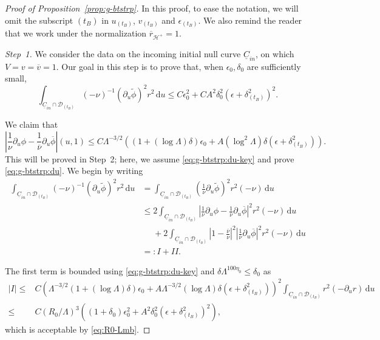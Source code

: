 \documentclass[10pt, reqno]{amsart}
\theoremstyle{definition}
\theoremstyle{remark}
\theoremstyle{conjecture}
\numberwithin{equation}{section}
\newcommand{\abs}[1]{\vert#1\vert}
\newcommand{\ud}{\mathrm{d}}
\newcommand{\rd}{\partial}
\newcommand{\0}{\emptyset}
\newcommand{\dlt}{\delta}
\newcommand{\eps}{\epsilon}
\newcommand{\Lmb}{\Lambda}
\newcommand{\calD}{\mathcal D}
\newcommand{\calH}{\mathcal H}
\newcommand{\uC}{\underline{C}}
\newcommand{\dur}{\nu}
\newcommand{\de}{\delta}
\newcommand{\EH}{\calH^{+}}
\newcommand{\pfstep}[1]{\vspace{.5em} {\it \noindent #1.}}
\newcommand{\vbg}{\overline{v}}					%
\newcommand{\phibg}{\overline{\phi}}				%
\newcommand{\durbg}{\overline{\dur}}				%
\newcommand{\rbg}{\overline{r}}					%
\newcommand{\phidf}{\widetilde{\phi}}				%
\newcommand{\Abs}[1]{\left\vert #1 \right\vert}
\begin{document}
\begin{proof}[Proof of Proposition~\ref{prop:g-btstrp}]
In this proof, to ease the notation, we will omit the subscript $(t_{B})$ in $u_{(t_{B})}$, $v_{(t_{B})}$ and $\eps_{(t_{B})}$. We also remind the reader that we work under the normalization $\rbg_{\EH} = 1$.


\pfstep{Step~1} We consider the data on the incoming initial null curve $\uC_{in}$, on which $V = v = \vbg = 1$. Our goal in this step is to prove that, when $\eps_{0}, \dlt_{0}$ are sufficiently small, 
\begin{equation} \label{eq:g-btstrp:du}
	\int_{\uC_{in} \cap \calD_{(t_{B})}} (-\dur)^{-1} (\rd_{u} \phidf)^{2} r^{2} \, \ud u
	\leq C \eps_{0}^{2} + C A^{2} \dlt_{0}^{2} \left( \eps + \dlt_{(t_{B})}^{2} \right)^{2}.
\end{equation}

We claim that 
\begin{equation} \label{eq:g-btstrp:du-key}
	\Abs{\frac{1}{\dur} \rd_{u} \phi - \frac{1}{\durbg} \rd_{u} \phibg}(u, 1) \leq C \Lmb^{-3/2} \left( (1 + (\log \Lmb) \dlt) \eps_{0} + A (\log^{2} \Lmb) \dlt \left( \eps + \dlt_{(t_{B})}^{2} \right) \right).
\end{equation}
This will be proved in Step~2; here, we assume \eqref{eq:g-btstrp:du-key} and prove \eqref{eq:g-btstrp:du}. We begin by writing
\begin{align*}
	\int_{\uC_{in} \cap \calD_{(t_{B})}} (- \dur)^{-1} (\rd_{u} \phidf)^{2} r^{2} \, \ud u
	& =  \int_{\uC_{in} \cap \calD_{(t_{B})}} \left( \frac{1}{\dur} \rd_{u} \phidf \right)^{2} r^{2} (- \dur) \, \ud u \\
	& \leq  2\int_{\uC_{in} \cap \calD_{(t_{B})}} \Abs{\frac{1}{\dur} \rd_{u} \phi - \frac{1}{\durbg} \rd_{u} \phibg}^{2} r^{2}(- \dur) \, \ud u \\ 
	& \phantom{\leq}
		 + 2\int_{\uC_{in} \cap \calD_{(t_{B})}} \Abs{ 1 - \frac{\durbg}{\dur}}^{2} \Abs{\frac{1}{\durbg} \rd_{u} \phibg}^{2} r^{2}(- \dur) \, \ud u \\
	& = :  I + II.
\end{align*}

The first term is bounded using \eqref{eq:g-btstrp:du-key} and $\de \Lambda^{100\eta_0}\leq \de_0$ as 
\begin{align*}
	\abs{I} 
	\leq & C \left( \Lmb^{-3/2} (1 + (\log \Lmb) \dlt) \eps_{0} + A \Lmb^{-3/2} (\log \Lmb) \dlt \left( \eps + \dlt_{(t_{B})}^{2} \right) \right)^{2} \int_{\uC_{in} \cap \calD_{(t_{B})}} r^{2} (- \rd_{u} r) \, \ud u \\
	\leq & C (R_{0} / \Lmb)^{3} \left( (1 + \dlt_{0}) \eps_{0}^{2} + A^{2} \dlt_{0}^{2} \left( \eps + \dlt_{(t_{B})}^{2} \right)^{2} \right),
\end{align*}
which is acceptable by \eqref{eq:R0-Lmb}.


\end{proof}
\end{document}
